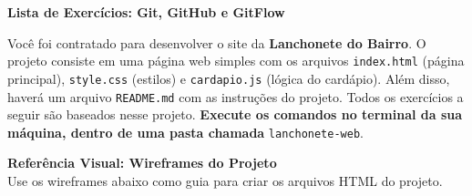 \documentclass[12pt]{article}
\begin{document}
\begin{center}
    \textcolor{meuazul}{\Large \textbf{Lista de Exercícios: Git, GitHub e GitFlow}}
\end{center}

\vspace{0.3cm}

\begin{tcolorbox}[
  colback=meuazul!5,
  colframe=meuazul,
  arc=4pt,
  title={\textbf{Contexto do Projeto}},
  fonttitle=\bfseries\color{white}
]
Você foi contratado para desenvolver o site da \textbf{Lanchonete do Bairro}. O projeto consiste em uma página web simples com os arquivos \texttt{index.html} (página principal), \texttt{style.css} (estilos) e \texttt{cardapio.js} (lógica do cardápio). Além disso, haverá um arquivo \texttt{README.md} com as instruções do projeto. Todos os exercícios a seguir são baseados nesse projeto. \textbf{Execute os comandos no terminal da sua máquina, dentro de uma pasta chamada} \texttt{lanchonete-web}.
\end{tcolorbox}

\vspace{0.4cm}

\begin{center}
    \textcolor{meuazul}{\large \textbf{Referência Visual: Wireframes do Projeto}}\\[0.15cm]
    {\small Use os wireframes abaixo como guia para criar os arquivos HTML do projeto.}
\end{center}
\vspace{0.3cm}
\end{document}
